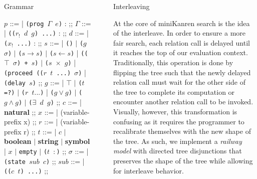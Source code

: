 \documentclass[final]{beamer}
\newlength{\sepwidth}
\newlength{\colwidth}
\newcommand{\separatorcolumn}{\begin{column}{\sepwidth}\end{column}}
\begin{document}
\begin{frame}[t]
\begin{columns}[t]
\begin{column}{\colwidth}
\begin{alertblock}{Grammar}
	\centering
    \begin{bnf}
$p$ ::=
| \texttt{(prog $\Gamma$ $e$)} :
;;
$\Gamma$ ::=
| \texttt{(($r_!$ $d$ $g$) ...)} :
;;
$d$ ::=
| \texttt{($x_!$ ...)} :
;;
$s$ ::=
| \texttt{()} $\vert$ \texttt{($g$ $\sigma$)} $\vert$ \texttt{($s \rightarrow s$)} $\vert$ \texttt{($s \leftarrow s$)} 
| \texttt{(($\top$ $\sigma$) + $s$)} $\vert$ \texttt{($s$ $\times$ $g$)} 
| \texttt{(proceed (($r$ $t$ ...) $\sigma$)} 
| \texttt{(delay $s$)} 
;;
$g$ ::= 
| $\top$ $\vert$ \texttt{($t$ =?)} $\vert$ \texttt{($r$ $t ...$)}
| \texttt{($g \vee g$)} $\vert$ \texttt{($g \wedge g$)} $\vert$ \texttt{($\exists$ $d$ $g$)}
;;
$c$ ::=
| \textbf{natural}
;;
$x$ ::=
| (variable-prefix x\text{$\colon$})
;;
$r$ ::=
| (variable-prefix r\text{$\colon$})
;;
$t$ ::=
| $c$ $\vert$ \textbf{boolean} $\vert$ \textbf{string} $\vert$ \textbf{symbol}
| $x$ $\vert$ \texttt{empty} $\vert$ \texttt{($t$ $\colon$)}
;;
$\sigma$  ::=
| \texttt{(state $sub$ $c$)}
;;
$sub$ ::=
| \texttt{(($c$ $t$) ...)}
;;
    \end{bnf}
\end{alertblock}




\end{column}

\separatorcolumn

\begin{column}{\colwidth}

  

  \begin{block}{Interleaving}

At the core of miniKanren search is the idea of the interleave. In order to ensure a more fair search, each relation call is delayed until it reaches the top of our evaluation context. Traditionally, this operation is done by flipping the tree such that the newly delayed relation call must wait for the other side of the tree to complete its computation or encounter another relation call to be invoked. Visually, however, this transformation is confusing as it requires the programmer to recalibrate themselves with the new shape of the tree. As such, we implement a \textit{railway model} with directed tree disjunctions that preserves the shape of the tree while allowing for interleave behavior.


\end{block}
\end{column}
\end{columns}
\end{frame}
\end{document}
